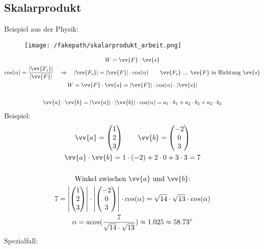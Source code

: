 \subsection{Skalarprodukt}
Beispiel aus der Physik:
\begin{figure}[H]
  \centering
  \texttt{[image: /fakepath/skalarprodukt\_arbeit.png]}
\end{figure}
\begin{gather*}
  W = \vv{F} \cdot \vv{s} \\
  cos(\alpha) = \frac{|\vv{F_s}|}{|\vv{F}|} \quad\Rightarrow\quad |\vv{F_s}| = |\vv{F}| \cdot cos(\alpha) \qquad \text{$\vv{F_s}$ ... $\vv{F}$ in Richtung $\vv{s}$} \\
  W = \vv{F} \cdot \vv{s} = |\vv{F}| \cdot cos(\alpha) \cdot |\vv{s}| \\\\
  \vv{a} \cdot \vv{b} = |\vv{a}| \cdot |\vv{b}| \cdot cos(\alpha) = a_1 \cdot b_1 + a_2 \cdot b_2 + a_3 \cdot b_3 \\
\end{gather*}
Beispiel:
\begin{gather*}
  \vv{a} = \begin{pmatrix}1 \\ 2 \\ 3\end{pmatrix} \qquad \vv{b} = \begin{pmatrix}-2 \\ 0 \\ 3\end{pmatrix} \\
  \vv{a} \cdot \vv{b} = 1 \cdot (-2) + 2 \cdot 0 + 3 \cdot 3 = 7 \\\\
  \text{Winkel zwischen $\vv{a}$ und $\vv{b}$:} \\
  7 = \left|\begin{pmatrix}1 \\ 2 \\ 3\end{pmatrix}\right| \cdot \left|\begin{pmatrix}-2 \\ 0 \\ 3\end{pmatrix}\right| \cdot cos(\alpha) = \sqrt{14} \cdot \sqrt{13} \cdot cos(\alpha) \\
  \alpha = acos(\frac{7}{\sqrt{14} \cdot \sqrt{13}}) \approx 1.025 \approx 58.73^\circ
\end{gather*}
Spezialfall:
